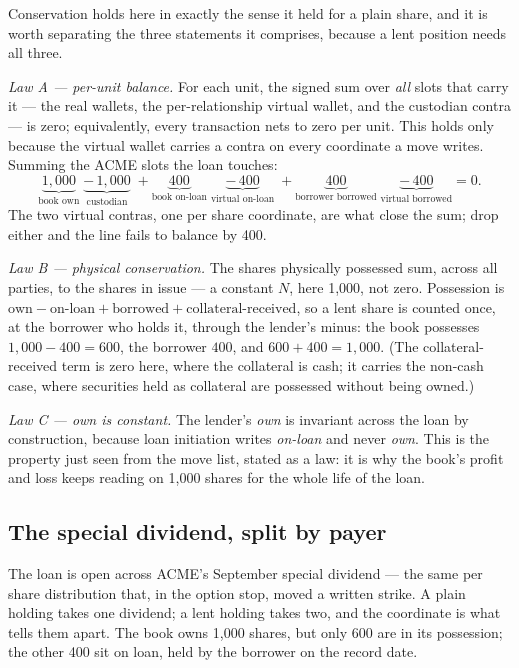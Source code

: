 Conservation holds here in exactly the sense it held for a plain share, and it is worth
separating the three statements it comprises, because a lent position needs all three.

\emph{Law A --- per-unit balance.} For each unit, the signed sum over \emph{all} slots
that carry it --- the real wallets, the per-relationship virtual wallet, and the
custodian contra --- is zero; equivalently, every transaction nets to zero per unit.
This holds only because the virtual wallet carries a contra on every coordinate a move
writes. Summing the ACME slots the loan touches:
\[
  \underbrace{1{,}000}_{\text{book own}} \; \underbrace{-\,1{,}000}_{\text{custodian}}
  \; + \underbrace{400}_{\text{book on-loan}} \; \underbrace{-\,400}_{\text{virtual on-loan}}
  \; + \underbrace{400}_{\text{borrower borrowed}} \; \underbrace{-\,400}_{\text{virtual borrowed}}
  = 0.
\]
The two virtual contras, one per share coordinate, are what close the sum; drop either
and the line fails to balance by 400.

\emph{Law B --- physical conservation.} The shares physically possessed sum, across all
parties, to the shares in issue --- a constant $N$, here 1{,}000, not zero. Possession is
$\text{own} - \text{on-loan} + \text{borrowed} + \text{collateral-received}$, so a lent
share is counted once, at the borrower who holds it, through the lender's minus: the
book possesses $1{,}000 - 400 = 600$, the borrower $400$, and $600 + 400 = 1{,}000$. (The
collateral-received term is zero here, where the collateral is cash; it carries the
non-cash case, where securities held as collateral are possessed without being owned.)

\emph{Law C --- own is constant.} The lender's \emph{own} is invariant across the loan by
construction, because loan initiation writes \emph{on-loan} and never \emph{own}. This is
the property just seen from the move list, stated as a law: it is why the book's profit
and loss keeps reading on 1{,}000 shares for the whole life of the loan.
\subsection{The special dividend, split by payer}

The loan is open across ACME's September special dividend --- the same  per share
distribution that, in the option stop, moved a written strike. A plain holding takes one
dividend; a lent holding takes two, and the coordinate is what tells them apart. The
book owns 1{,}000 shares, but only 600 are in its possession; the other 400 sit on loan,
held by the borrower on the record date.

